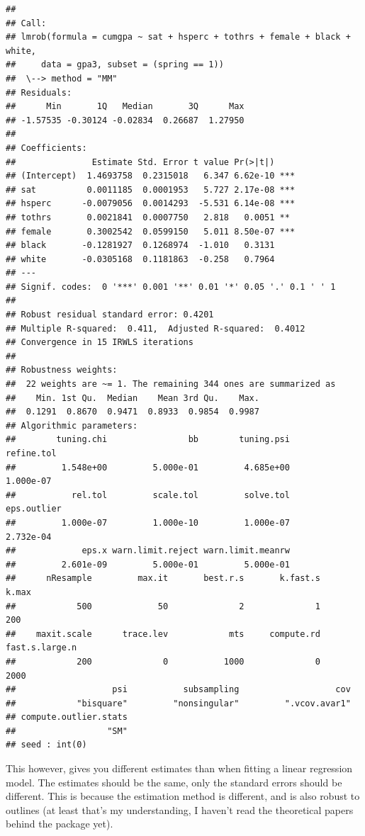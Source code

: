 \documentclass[]{book}
\begin{document}
\begin{verbatim}
## 
## Call:
## lmrob(formula = cumgpa ~ sat + hsperc + tothrs + female + black + white, 
##     data = gpa3, subset = (spring == 1))
##  \--> method = "MM"
## Residuals:
##      Min       1Q   Median       3Q      Max 
## -1.57535 -0.30124 -0.02834  0.26687  1.27950 
## 
## Coefficients:
##               Estimate Std. Error t value Pr(>|t|)    
## (Intercept)  1.4693758  0.2315018   6.347 6.62e-10 ***
## sat          0.0011185  0.0001953   5.727 2.17e-08 ***
## hsperc      -0.0079056  0.0014293  -5.531 6.14e-08 ***
## tothrs       0.0021841  0.0007750   2.818   0.0051 ** 
## female       0.3002542  0.0599150   5.011 8.50e-07 ***
## black       -0.1281927  0.1268974  -1.010   0.3131    
## white       -0.0305168  0.1181863  -0.258   0.7964    
## ---
## Signif. codes:  0 '***' 0.001 '**' 0.01 '*' 0.05 '.' 0.1 ' ' 1
## 
## Robust residual standard error: 0.4201 
## Multiple R-squared:  0.411,  Adjusted R-squared:  0.4012 
## Convergence in 15 IRWLS iterations
## 
## Robustness weights: 
##  22 weights are ~= 1. The remaining 344 ones are summarized as
##    Min. 1st Qu.  Median    Mean 3rd Qu.    Max. 
##  0.1291  0.8670  0.9471  0.8933  0.9854  0.9987 
## Algorithmic parameters: 
##        tuning.chi                bb        tuning.psi        refine.tol 
##         1.548e+00         5.000e-01         4.685e+00         1.000e-07 
##           rel.tol         scale.tol         solve.tol       eps.outlier 
##         1.000e-07         1.000e-10         1.000e-07         2.732e-04 
##             eps.x warn.limit.reject warn.limit.meanrw 
##         2.601e-09         5.000e-01         5.000e-01 
##      nResample         max.it       best.r.s       k.fast.s          k.max 
##            500             50              2              1            200 
##    maxit.scale      trace.lev            mts     compute.rd fast.s.large.n 
##            200              0           1000              0           2000 
##                   psi           subsampling                   cov 
##            "bisquare"         "nonsingular"         ".vcov.avar1" 
## compute.outlier.stats 
##                  "SM" 
## seed : int(0)
\end{verbatim}

This however, gives you different estimates than when fitting a linear regression model. The estimates should be the same, only the standard errors should be different. This is because the estimation method is different, and is also robust to outlines (at least that's my understanding, I haven't read the theoretical papers behind the package yet).
\end{document}
